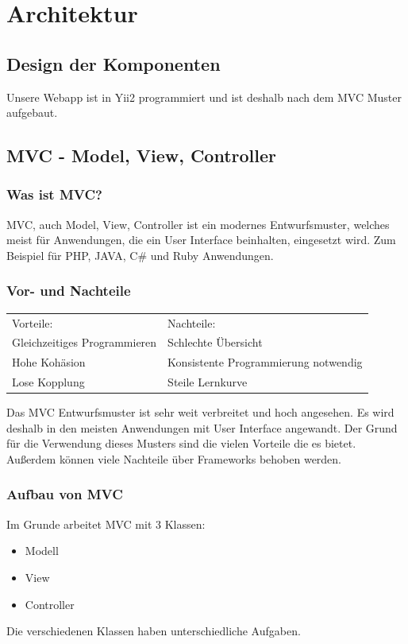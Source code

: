 \section{Architektur}
\def \currentAuthor{Florian Tipotsch}
\subsection{Design der Komponenten}

Unsere Webapp ist in Yii2 programmiert und ist deshalb nach dem MVC Muster aufgebaut.
\subsection{MVC - Model, View, Controller}\label{sec:MVC}

\subsubsection{Was ist MVC?} 
MVC, auch Model, View, Controller ist ein modernes Entwurfsmuster, welches meist für Anwendungen, die ein User Interface beinhalten, eingesetzt wird. Zum Beispiel für PHP, JAVA, C\# und Ruby Anwendungen. \cite{MVC}

\subsubsection{Vor- und Nachteile}
\begin{tabular}{ l l }
	Vorteile: & Nachteile: \\
	Gleichzeitiges Programmieren & Schlechte Übersicht \\
	Hohe Kohäsion \cite{kohaesion} & Konsistente Programmierung notwendig\\
	Lose Kopplung \cite{kopplung} & Steile Lernkurve \\	
\end{tabular}

Das MVC Entwurfsmuster ist sehr weit verbreitet und hoch angesehen. Es wird deshalb in den meisten Anwendungen mit User Interface angewandt. Der Grund für die Verwendung dieses Musters sind die vielen Vorteile die es bietet. Außerdem können viele Nachteile über Frameworks behoben werden.

\subsubsection{Aufbau von MVC}
Im Grunde arbeitet MVC mit 3 Klassen:
\begin{itemize}
	\item Modell
	\item View
	\item Controller
\end{itemize}
Die verschiedenen Klassen haben unterschiedliche Aufgaben.

